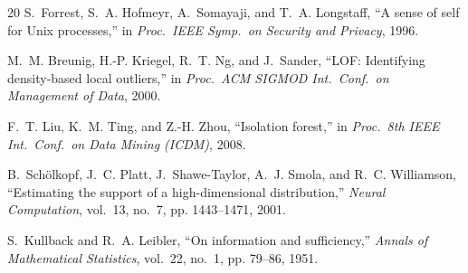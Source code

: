 \documentclass[conference]{IEEEtran}
\begin{document}
\begin{thebibliography}{20}
S.~Forrest, S.~A. Hofmeyr, A.~Somayaji, and T.~A. Longstaff, ``A sense of self
for Unix processes,'' in \emph{Proc.\ IEEE Symp.\ on Security and Privacy},
1996.

M.~M. Breunig, H.-P. Kriegel, R.~T. Ng, and J.~Sander, ``LOF: Identifying
density-based local outliers,'' in \emph{Proc.\ ACM SIGMOD Int.\ Conf.\ on
Management of Data}, 2000.

F.~T. Liu, K.~M. Ting, and Z.-H. Zhou, ``Isolation forest,'' in \emph{Proc.\
8th IEEE Int.\ Conf.\ on Data Mining (ICDM)}, 2008.

B.~Sch\"olkopf, J.~C. Platt, J.~Shawe-Taylor, A.~J. Smola, and R.~C.
Williamson, ``Estimating the support of a high-dimensional distribution,''
\emph{Neural Computation}, vol.~13, no.~7, pp. 1443--1471, 2001.

S.~Kullback and R.~A. Leibler, ``On information and sufficiency,''
\emph{Annals of Mathematical Statistics}, vol.~22, no.~1, pp. 79--86, 1951.

\end{thebibliography}
\end{document}
